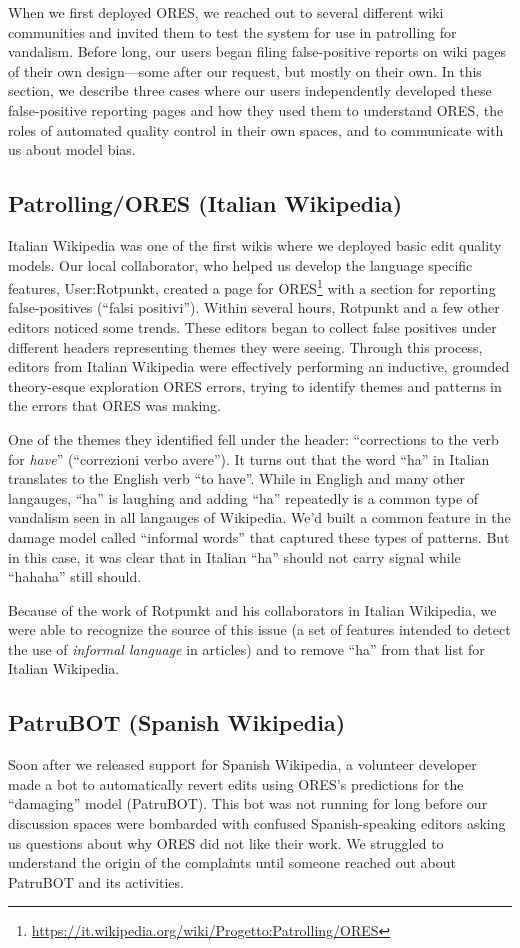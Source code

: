 When we first deployed ORES, we reached out to several different wiki communities and invited them to test the system for use in patrolling for vandalism.  Before long, our users began filing false-positive reports on wiki pages of their own design---some after our request, but mostly on their own.  In this section, we describe three cases where our users independently developed these false-positive reporting pages and how they used them to understand ORES, the roles of automated quality control in their own spaces, and to communicate with us about model bias.

\subsection{Patrolling/ORES (Italian Wikipedia)}
Italian Wikipedia was one of the first wikis where we deployed basic edit quality models.  Our local collaborator, who helped us develop the language specific features, User:Rotpunkt, created a page for ORES\footnote{\url{https://it.wikipedia.org/wiki/Progetto:Patrolling/ORES}} with a section for reporting false-positives (``falsi positivi'').  Within several hours, Rotpunkt and a few other editors noticed some trends.  These editors began to collect false positives under different headers representing themes they were seeing.  Through this process, editors from Italian Wikipedia were effectively performing an inductive, grounded theory-esque exploration ORES errors, trying to identify themes and patterns in the errors that ORES was making.

One of the themes they identified fell under the header: ``corrections to the verb for \emph{have}'' (``correzioni verbo avere'').  It turns out that the word ``ha'' in Italian translates to the English verb ``to have''.  While in Engligh and many other langauges, ``ha'' is laughing and adding ``ha'' repeatedly is a common type of vandalism seen in all langauges of Wikipedia.  We'd built a common feature in the damage model called ``informal words'' that captured these types of patterns.  But in this case, it was clear that in Italian ``ha'' should not carry signal while ``hahaha'' still should.

Because of the work of Rotpunkt and his collaborators in Italian Wikipedia, we were able to recognize the source of this issue (a set of features intended to detect the use of \emph{informal language} in articles) and to remove ``ha'' from that list for Italian Wikipedia.

\subsection{PatruBOT (Spanish Wikipedia)}
Soon after we released support for Spanish Wikipedia, a volunteer developer made a bot to automatically revert edits using ORES's predictions for the ``damaging'' model (PatruBOT).  This bot was not running for long before our discussion spaces were bombarded with confused Spanish-speaking editors asking us questions about why ORES did not like their work.  We struggled to understand the origin of the complaints until someone reached out about PatruBOT and its activities.

